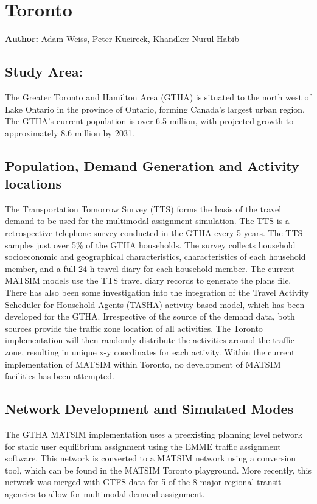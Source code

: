 \section{Toronto}
\label{sec:toronto}
\hfill \textbf{Author:} Adam Weiss, Peter Kucireck, Khandker Nurul Habib

\subsection{Study Area:}
The Greater Toronto and Hamilton Area (GTHA) is situated to the north west of Lake Ontario in the province of Ontario, forming Canada’s largest urban region. The GTHA’s current population is over 6.5 million, with projected growth to approximately 8.6 million by 2031. 

\subsection{Population, Demand Generation and Activity locations}
The Transportation Tomorrow Survey (TTS) forms the basis of the travel demand to be used for the multimodal assignment simulation. The TTS is a retrospective telephone survey conducted in the GTHA every 5 years. The TTS samples just over 5\% of the GTHA households. The survey collects household socioeconomic and geographical characteristics, characteristics of each household member, and a full 24 h travel diary for each household member. The current MATSIM models use the TTS travel diary records to generate the plans file. There has also been some investigation into the integration of the Travel Activity Scheduler for Household Agents (TASHA) activity based model, which has been developed for the GTHA. Irrespective of the source of the demand data, both sources provide the traffic zone location of all activities. The Toronto implementation will then randomly distribute the activities around the traffic zone, resulting in unique x-y coordinates for each activity. Within the current implementation of MATSIM within Toronto, no development of MATSIM facilities has been attempted.

\subsection{Network Development and Simulated Modes}  
The GTHA MATSIM implementation uses a preexisting planning level network for static user equilibrium assignment using the EMME traffic assignment software. This network is converted to a MATSIM network using a conversion tool, which can be found in the MATSIM Toronto playground. More recently, this network was merged with GTFS data for 5 of the 8 major regional transit agencies to allow for multimodal demand assignment.  

